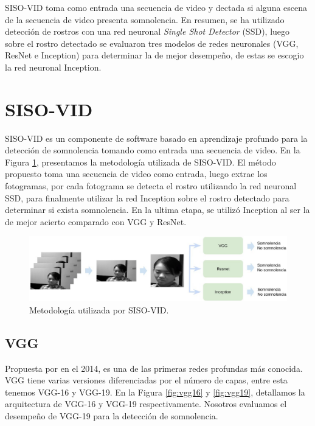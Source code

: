 \documentclass{article}
\begin{document}
	SISO-VID toma como entrada una secuencia de video y dectada si alguna escena de la secuencia de video presenta somnolencia. En resumen, se ha utilizado detección de rostros con una red neuronal \textit{Single Shot Detector} (SSD), luego sobre el rostro detectado se evaluaron tres modelos de redes neuronales (VGG, ResNet e Inception) para determinar la de mejor desempeño, de estas se escogio la red neuronal Inception. 
	
	
	
	\section{SISO-VID} \label{desarrollo}
	
	SISO-VID es un componente de software basado en aprendizaje profundo para la detección de somnolencia tomando como entrada una secuencia de video. En la Figura \ref{fig:siso_vid}, presentamos la metodología utilizada de SISO-VID. El método propuesto toma una secuencia de video como entrada, luego extrae los fotogramas, por cada fotograma se detecta el rostro utilizando la red neuronal SSD, para finalmente utilizar la red Inception sobre el rostro detectado para determinar si exista somnolencia. En la ultima etapa, se utilizó Inception al ser la de mejor acierto comparado con VGG y ResNet.\\
	
	\begin{figure}[H]
		\includegraphics[width=\textwidth]{img/siso_vid}		
		\caption{Metodología utilizada por SISO-VID.}
		\label{fig:siso_vid}
	\end{figure}

	
	\subsection{VGG}
	
	Propuesta por \cite{simonyan2014very} en el 2014, es una de las primeras redes profundas más conocida. VGG tiene varias versiones diferenciadas por el número de capas, entre esta tenemos VGG-16 y VGG-19. En la Figura \ref{fig:vgg16} y \ref{fig:vgg19}, detallamos la arquitectura de VGG-16 y VGG-19 respectivamente. Nosotros evaluamos el desempeño de VGG-19 para la detección de somnolencia.
	
\end{document}
